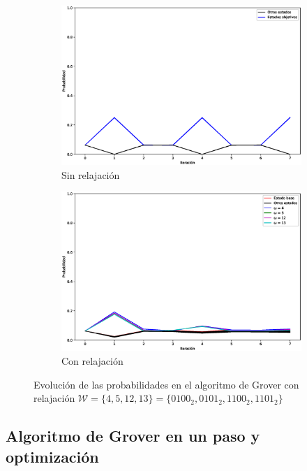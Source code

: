 \begin{figure}[H]
    \centering
    \begin{subfigure}[m]{0.49\textwidth}
        \centering
        \includegraphics[width=0.99\linewidth]{img/grover3lossless.eps}
        \caption{Sin relajación}
    \end{subfigure}
    \begin{subfigure}[m]{0.49\textwidth}
        \centering
        \includegraphics[width=0.99\linewidth]{img/grover3loss.eps}
        \caption{Con relajación}
    \end{subfigure}
    \caption[Evolución de las probabilidades en el algoritmo de Grover con relajación $\mathcal{W} = \{4, 5, 12, 13\}$]{Evolución de las probabilidades en el algoritmo de Grover con relajación $\mathcal{W} = \{4, 5, 12, 13\} = \{0100_2, 0101_2, 1100_2, 1101_2\}$}
    \label{fig:groverlosscomp3}
\end{figure}


\subsection{Algoritmo de Grover en un paso y optimización}



